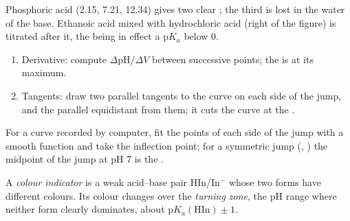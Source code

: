 Phosphoric acid (2.15, 7.21, 12.34) gives two clear ; the
third is lost in the water of the base. Ethanoic acid mixed with
hydrochloric acid (right of the figure) is titrated after it, the  being in effect a $\mathrm{p}K_a$ below 0.

\begin{method}\label{met:b1:titration-methods:derivative}
\begin{enumerate}
  \item Derivative: compute $\Delta\mathrm{pH}/\Delta V$ between
        successive points; the  is at its maximum.
  \item Tangents: draw two parallel tangents to the curve on each side of
        the jump, and the parallel equidistant from them; it cuts the
        curve at the .
\end{enumerate}
\end{method}

\begin{method}\label{met:b1:titration-methods:tangents}
For a curve recorded by computer, fit the points of each side of the
jump with a smooth function and take the inflection point; for a
symmetric jump (, ) the midpoint of the jump at pH
7 is the .
\end{method}

\begin{definition}\label{def:b1:titration-methods:indicator}
A \emph{colour indicator} is a weak acid--base
pair HIn/In$^-$ whose two forms have different colours. Its colour changes
over the \emph{turning zone}, the pH range where
neither form clearly dominates, about $\mathrm{p}K_{a}(\mathrm{HIn}) \pm 1$.
\end{definition}

